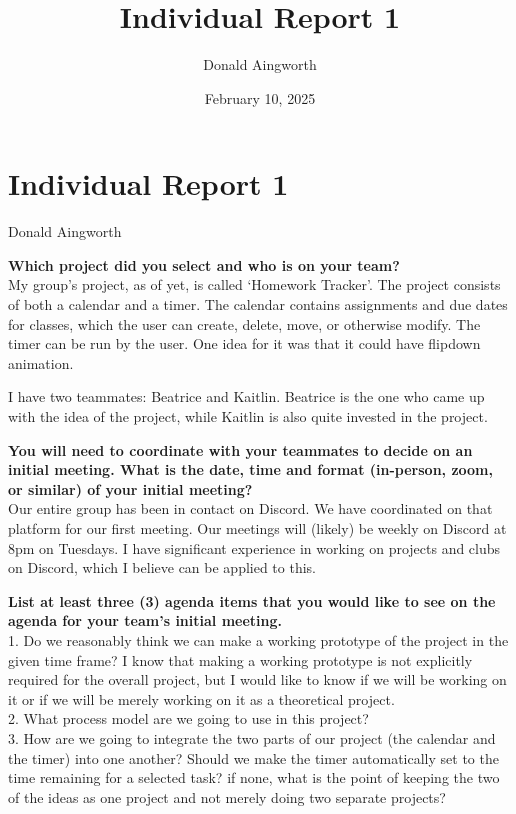 \documentclass[12pt]{article}
\title{Individual Report 1}
\author{Donald Aingworth}
\date{February 10, 2025}
\begin{document}
\section*{Individual Report 1}
Donald Aingworth

\textbf{Which project did you select and who is on your team?}\\
My group's project, as of yet, is called `Homework Tracker'. 
The project consists of both a calendar and a timer. 
The calendar contains assignments and due dates for classes, which the user can create, delete, move, or otherwise modify.
The timer can be run by the user. One idea for it was that it could have flipdown animation.

I have two teammates: Beatrice and Kaitlin. Beatrice is the one who came up with the idea of the project, while Kaitlin is also quite invested in the project.\par

\textbf{You will need to coordinate with your teammates to decide on an initial meeting.  What is the date, time and format (in-person, zoom, or similar) of your initial meeting?}\\
Our entire group has been in contact on Discord. We have coordinated on that platform for our first meeting. Our meetings will (likely) be weekly on Discord at 8pm on Tuesdays. I have significant experience in working on projects and clubs on Discord, which I believe can be applied to this.


\textbf{List at least three (3) agenda items that you would like to see on the agenda for your team's initial meeting.}\\
1. Do we reasonably think we can make a working prototype of the project in the given time frame? I know that making a working prototype is not explicitly required for the overall project, but I would like to know if we will be working on it or if we will be merely working on it as a theoretical project.\\
2. What process model are we going to use in this project?\\
3. How are we going to integrate the two parts of our project (the calendar and the timer) into one another? Should we make the timer automatically set to the time remaining for a selected task? if none, what is the point of keeping the two of the ideas as one project and not merely doing two separate projects?
\end{document}
